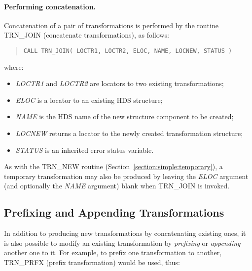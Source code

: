\documentclass[twoside,11pt]{article}
\newcommand{\xlabel}[1]{}
\newcommand{\name}[1]{\mbox{\small{#1}}}
\newcommand{\fortvar}[1]{\mbox{\emph{#1}}}
\begin{document}
\paragraph{Performing concatenation.}
Concatenation of a pair of transformations is performed by the routine
\name{TRN\_JOIN} (concatenate transformations), as follows:

\begin{quote}
\begin{verbatim}
CALL TRN_JOIN( LOCTR1, LOCTR2, ELOC, NAME, LOCNEW, STATUS )
\end{verbatim}
\end{quote}

where:

\begin{itemize}

\item \fortvar{LOCTR1} and \fortvar{LOCTR2} are locators to two existing
transformations; 

\item \fortvar{ELOC} is a locator to an existing \name{HDS} structure;

\item \fortvar{NAME} is the \name{HDS} name of the new structure component 
to be created;

\item \fortvar{LOCNEW} returns a locator to the newly created transformation 
structure;

\item \fortvar{STATUS} is an inherited error status variable.

\end{itemize}

As with the \name{TRN\_NEW} routine
(Section~\ref{section:simple:temporary}), a temporary transformation may
also be produced by leaving the \fortvar{ELOC} argument (and optionally the
\fortvar{NAME} argument) blank when \name{TRN\_JOIN} is invoked. 


\subsection{\xlabel{prefixing_and_appending_transformations}Prefixing and Appending Transformations}

\label{section:additional:prefix}

In addition to producing new transformations by concatenating existing ones,
it is also possible to modify an existing transformation by \emph{prefixing}
or \emph{appending} another one to it. 
For example, to prefix one transformation to another, \name{TRN\_PRFX}
(prefix transformation) would be used, thus: 
\end{document}
